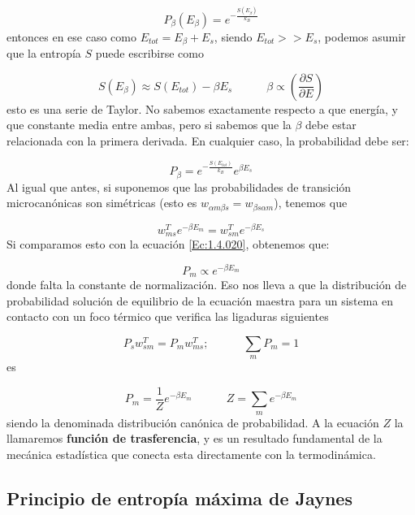\documentclass[12pt,a4paper]{article}
\numberwithin{equation}{section}
\numberwithin{figure}{section}
\newcommand{\tquad}{\quad \quad \quad}
\newcommand{\parentesis}[1]{\left( #1  \right)}
\newcommand{\parciales}[2]{\frac{\partial #1}{\partial #2}}
\newcommand{\pparciales}[2]{\parentesis{\parciales{#1}{#2}}}
\theoremstyle{definition}
\begin{document}
\begin{equation}
P_\beta (E_\beta) = e^{- \frac{S (E_\beta)}{k_B}}
\end{equation}
entonces en ese caso como $E_{tot} = E_{\beta} + E_s$, siendo $E_{tot} >> E_s$, podemos asumir que la entropía $S$ puede escribirse como

\begin{equation}
S(E_{\beta}) \approx S(E_{tot}) - \beta E_s \tquad \beta \propto \pparciales{S}{E}
\end{equation}
esto es una serie de Taylor. No sabemos exactamente respecto a que energía, y que constante media entre ambas, pero si sabemos que la $\beta$ debe estar relacionada con la primera derivada. En cualquier caso, la probabilidad debe ser:
 
\begin{equation}
P_\beta = e^{-\frac{ S(E_{tot})}{k_B}} e^{\beta E_s} 
\end{equation}
Al igual que antes, si suponemos que las probabilidades de transición microcanónicas son simétricas (esto es $w_{\alpha m \beta s}=w_{\beta s \alpha m}$), tenemos que

\begin{equation}
w^T_{ms} e^{- \beta E_m} = w_{sm}^T e^{- \beta E_s}
\end{equation}
Si comparamos esto con la ecuación \ref{Ec:1.4.020}, obtenemos que:

\begin{equation}
P_m \varpropto e^{-\beta E_m}
\end{equation}
donde falta la constante de normalización. Eso nos lleva a que la distribución de probabilidad solución de equilibrio de la ecuación maestra para un sistema en contacto con un foco térmico que verifica las ligaduras siguientes

\begin{equation}
P_s w_{sm}^T = P_m w_{ms}^T; \tquad \sum_m P_m =1
\end{equation}
es

\begin{equation}
P_m = \frac{1}{Z} e^{- \beta E_m } \tquad Z=\sum_m e^{-\beta E_m}
\end{equation}
siendo la denominada distribución canónica de probabilidad. A la ecuación $Z$ la llamaremos \textbf{función de trasferencia}, y es un resultado fundamental de la mecánica estadística que conecta esta directamente con la termodinámica.

\subsection{Principio de entropía máxima de Jaynes}
\end{document}
